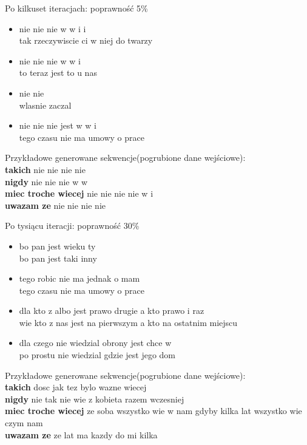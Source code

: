 \documentclass[11pt,leqno]{article}
\begin{document}
\begin{multicols}{2}
    Po kilkuset iteracjach: poprawność 5\%\\
    \begin{itemize}
        \item   nie nie nie w w i i\\
                tak rzeczywiscie ci w niej do twarzy

        \item   nie nie nie w w i\\
                to teraz jest to u nas

        \item   nie nie \\
                wlasnie zaczal

        \item   nie nie nie jest w w i \\
                tego czasu nie ma umowy o prace
    \end{itemize}

    Przykładowe generowane sekwencje(pogrubione dane wejściowe): \\
    \textbf{takich} nie nie nie nie \\
    \textbf{nigdy} nie nie nie w w \\
    \textbf{miec troche wiecej} nie nie nie nie w i \\
    \textbf{uwazam ze} nie nie nie nie

    \columnbreak
    Po tysiącu iteracji: poprawność 30\%\\
    \begin{itemize}
        \item   bo pan jest wieku ty \\
                bo pan jest taki inny

        \item   tego robic nie ma jednak o mam \\
                tego czasu nie ma umowy o prace

        \item   dla kto z albo jest prawo drugie a kto prawo i raz \\
                wie kto z nas jest na pierwszym a kto na ostatnim miejscu

        \item   dla czego nie wiedzial obrony jest chce w \\
                po prostu nie wiedzial gdzie jest jego dom
    \end{itemize}

    Przykładowe generowane sekwencje(pogrubione dane wejściowe): \\
    \textbf{takich} dosc jak tez bylo wazne wiecej \\
    \textbf{nigdy} nie tak nie wie z kobieta razem wczesniej \\
    \textbf{miec troche wiecej} ze soba wszystko wie w nam gdyby kilka lat wszystko wie czym nam \\
    \textbf{uwazam ze} ze lat ma kazdy do mi kilka
\end{multicols}
\end{document}
